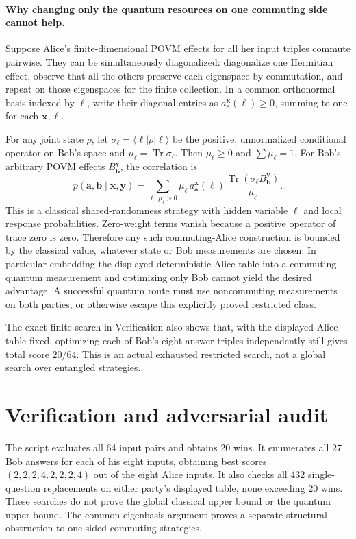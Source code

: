 \documentclass[11pt]{article}
\begin{document}
\paragraph{Why changing only the quantum resources on one commuting side cannot help.}
Suppose Alice's finite-dimensional POVM effects for all her input triples commute pairwise. They can be simultaneously diagonalized: diagonalize one Hermitian effect, observe that all the others preserve each eigenspace by commutation, and repeat on those eigenspaces for the finite collection. In a common orthonormal basis indexed by $\ell$, write their diagonal entries as $a_{\mathbf a}^{\mathbf x}(\ell)\geq0$, summing to one for each $\mathbf x,\ell$.

For any joint state $\rho$, let $\sigma_\ell=\langle\ell|\rho|\ell\rangle$ be the positive, unnormalized conditional operator on Bob's space and $\mu_\ell=\operatorname{Tr}\sigma_\ell$. Then $\mu_\ell\geq0$ and $\sum\mu_\ell=1$. For Bob's arbitrary POVM effects $B_{\mathbf b}^{\mathbf y}$, the correlation is
\[
p(\mathbf a,\mathbf b\mid\mathbf x,\mathbf y)
=\sum_{\ell:\mu_\ell>0}\mu_\ell\,
 a_{\mathbf a}^{\mathbf x}(\ell)
 \frac{\operatorname{Tr}(\sigma_\ell B_{\mathbf b}^{\mathbf y})}{\mu_\ell}.
\]
This is a classical shared-randomness strategy with hidden variable $\ell$ and local response probabilities. Zero-weight terms vanish because a positive operator of trace zero is zero. Therefore any such commuting-Alice construction is bounded by the classical value, whatever state or Bob measurements are chosen. In particular embedding the displayed deterministic Alice table into a commuting quantum measurement and optimizing only Bob cannot yield the desired advantage. A successful quantum route must use noncommuting measurements on both parties, or otherwise escape this explicitly proved restricted class.

The exact finite search in Verification also shows that, with the displayed Alice table fixed, optimizing each of Bob's eight answer triples independently still gives total score $20/64$. This is an actual exhausted restricted search, not a global search over entangled strategies.
\section{Verification and adversarial audit}
The script evaluates all 64 input pairs and obtains 20 wins. It enumerates all 27 Bob answers for each of his eight inputs, obtaining best scores $(2,2,2,4,2,2,2,4)$ out of the eight Alice inputs. It also checks all 432 single-question replacements on either party's displayed table, none exceeding 20 wins. These searches do not prove the global classical upper bound or the quantum upper bound. The common-eigenbasis argument proves a separate structural obstruction to one-sided commuting strategies.
\end{document}
